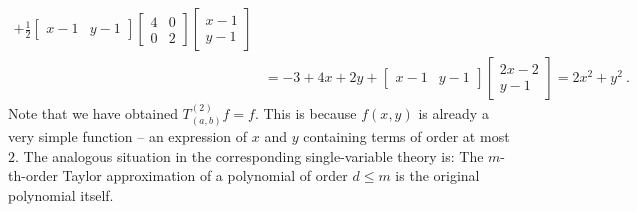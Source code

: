 \begin{example}
\begin{enumerate}[(i)]
\begin{equation*}
\begin{split}
	+ \frac{1}{2} \begin{bmatrix} x-1 & y-1 \end{bmatrix}
	\begin{bmatrix} 4 & 0 \\ 0 & 2 \end{bmatrix}
	\begin{bmatrix} x-1 \\ y-1 \end{bmatrix} \\
	& = -3 + 4x + 2y + \begin{bmatrix} x-1 & y-1 \end{bmatrix}
	\begin{bmatrix} 2x-2 \\ y-1 \end{bmatrix} = 2x^2 + y^2 \:. 
	\end{split}
	\end{equation*}
	Note that we have obtained $T_{(a,b)}^{(2)}f=f$. This is because $f(x,y)$ is already a very simple function -- an expression of $x$ and $y$ containing terms of order at most $2$. The analogous situation in the corresponding single-variable theory is: The $m$-th-order Taylor approximation of a polynomial of order $d \leq m$ is the original polynomial itself. 
	

\end{enumerate}
\end{example}
